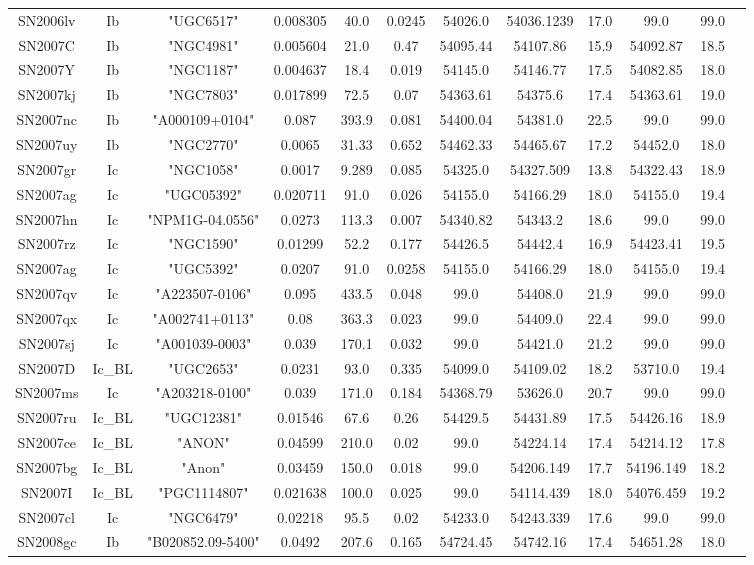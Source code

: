 \begin{table*}
\begin{tabular}{cccccccccccc}
SN2006lv&Ib&"UGC6517"&0.008305&40.0&0.0245&54026.0&54036.1239&17.0&99.0&99.0\\ 
SN2007C&Ib&"NGC4981"&0.005604&21.0&0.47&54095.44&54107.86&15.9&54092.87&18.5\\ 
SN2007Y&Ib&"NGC1187"&0.004637&18.4&0.019&54145.0&54146.77&17.5&54082.85&18.0\\ 
SN2007kj&Ib&"NGC7803"&0.017899&72.5&0.07&54363.61&54375.6&17.4&54363.61&19.0\\ 
SN2007nc&Ib&"A000109+0104"&0.087&393.9&0.081&54400.04&54381.0&22.5&99.0&99.0\\ 
SN2007uy&Ib&"NGC2770"&0.0065&31.33&0.652&54462.33&54465.67&17.2&54452.0&18.0\\ 
SN2007gr&Ic&"NGC1058"&0.0017&9.289&0.085&54325.0&54327.509&13.8&54322.43&18.9\\ 
SN2007ag&Ic&"UGC05392"&0.020711&91.0&0.026&54155.0&54166.29&18.0&54155.0&19.4\\ 
SN2007hn&Ic&"NPM1G-04.0556"&0.0273&113.3&0.007&54340.82&54343.2&18.6&99.0&99.0\\ 
SN2007rz&Ic&"NGC1590"&0.01299&52.2&0.177&54426.5&54442.4&16.9&54423.41&19.5\\ 
SN2007ag&Ic&"UGC5392"&0.0207&91.0&0.0258&54155.0&54166.29&18.0&54155.0&19.4\\ 
SN2007qv&Ic&"A223507-0106"&0.095&433.5&0.048&99.0&54408.0&21.9&99.0&99.0\\ 
SN2007qx&Ic&"A002741+0113"&0.08&363.3&0.023&99.0&54409.0&22.4&99.0&99.0\\ 
SN2007sj&Ic&"A001039-0003"&0.039&170.1&0.032&99.0&54421.0&21.2&99.0&99.0\\ 
SN2007D&Ic_BL&"UGC2653"&0.0231&93.0&0.335&54099.0&54109.02&18.2&53710.0&19.4\\ 
SN2007ms&Ic&"A203218-0100"&0.039&171.0&0.184&54368.79&53626.0&20.7&99.0&99.0\\ 
SN2007ru&Ic_BL&"UGC12381"&0.01546&67.6&0.26&54429.5&54431.89&17.5&54426.16&18.9\\ 
SN2007ce&Ic_BL&"ANON"&0.04599&210.0&0.02&99.0&54224.14&17.4&54214.12&17.8\\ 
SN2007bg&Ic_BL&"Anon"&0.03459&150.0&0.018&99.0&54206.149&17.7&54196.149&18.2\\ 
SN2007I&Ic_BL&"PGC1114807"&0.021638&100.0&0.025&99.0&54114.439&18.0&54076.459&19.2\\ 
SN2007cl&Ic&"NGC6479"&0.02218&95.5&0.02&54233.0&54243.339&17.6&99.0&99.0\\ 
SN2008gc&Ib&"B020852.09-5400"&0.0492&207.6&0.165&54724.45&54742.16&17.4&54651.28&18.0\\ 

\end{tabular}
\end{table*}
